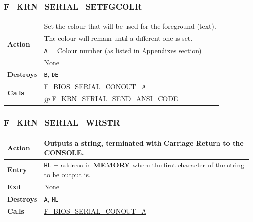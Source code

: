 \documentclass[a4paper,11pt]{article}
\begin{document}
        \subsubsection{F\_KRN\_SERIAL\_SETFGCOLR}
        \label{func:fkrnserialsetfgcolr}
        \begin{tabular}{l p{9cm}}
            \hline\multirow[t]{4}{4em}{\textbf{Action}}
            & Set the colour that will be used for the foreground (text). \\
            & The colour will remain until a different one is set. \\
            \hline\textbf{Entry} & \texttt{A} = Colour number (as listed in 
            \hyperref[sec:appendixes]{Appendixes} section) \\
            \hline\textbf{Exit} & None \\
            \hline\textbf{Destroys} & \texttt{B}, \texttt{DE} \\
            \hline\multirow[t]{2}{4em}{\textbf{Calls}} 
            & \hyperref[func:fbiosserialconouta]{F\_BIOS\_SERIAL\_CONOUT\_A}\\
            & \textit{jp} \hyperref[func:fkrnserialsendansicode]{F\_KRN\_SERIAL\_SEND\_ANSI\_CODE}\\
            \hline
        \end{tabular}

        \subsubsection{F\_KRN\_SERIAL\_WRSTR}
        \label{func:fkrnserialwrstr}
        \begin{tabular}{l p{9cm}}
            \hline\multirow[t]{4}{4em}{\textbf{Action}}
            & Outputs a string, terminated with Carriage Return to the 
            \textbf{CONSOLE}.\\
            \hline\textbf{Entry} 
            & \texttt{HL} = address in \textbf{MEMORY} where the first character
            of the string to be output is.\\
            \hline\textbf{Exit} & None \\
            \hline\textbf{Destroys} & \texttt{A}, \texttt{HL} \\
            \hline\textbf{Calls}
            & \hyperref[func:fbiosserialconouta]{F\_BIOS\_SERIAL\_CONOUT\_A}\\
            \hline
        \end{tabular}
\end{document}
